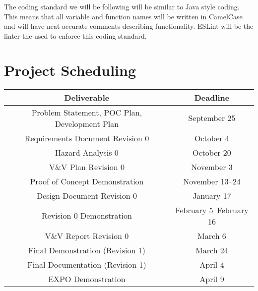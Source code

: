 \documentclass{article}
\begin{document}
The coding standard we will be following will be similar to Java style coding. This means that all variable and function names will be written in CamelCase and will have neat accurate comments describing functionality. ESLint will be the linter the used to enforce this coding standard.

\section{Project Scheduling}

\begin{center}
\begin{tabular}{ |c|c| } 
\hline
\textbf{Deliverable} & \textbf{Deadline} \\ 
 \hline
 Problem Statement, POC Plan, Development Plan & September 25 \\ 
 Requirements Document Revision 0  & October 4 \\
Hazard Analysis 0 & October 20  \\ 
 V\&V Plan Revision 0 & November 3 \\ 
Proof of Concept Demonstration & November 13--24 \\
Design Document Revision 0 & January 17 \\
Revision 0 Demonstration & February 5--February 16\\
V\&V Report Revision 0 & March 6 \\
Final Demonstration (Revision 1) & March 24 \\
Final Documentation (Revision 1) & April 4 \\
EXPO Demonstration & April 9 \\
 \hline
\end{tabular}
\end{center}

\end{document}
